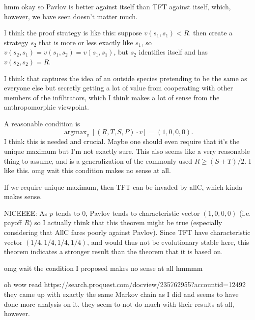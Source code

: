 \documentclass[11pt]{amsart}
\DeclareMathOperator*{\argmax}{argmax}
\theoremstyle{definition}
\theoremstyle{remark}
\begin{document}
hmm okay so Pavlov is better against itself than TFT against itself, which, however, we have seen doesn't matter much.


I think the proof strategy is like this: suppose $v(s_1,s_1) < R$. then create a strategy $s_2$ that is more or less exactly like $s_1$, so $v(s_2,s_1) = v(s_1,s_2) = v(s_1,s_1)$, but $s_2$ identifies itself and has $v(s_2,s_2) = R$.

I think that captures the idea of an outside species pretending to be the same as everyone else but secretly getting a lot of value from cooperating with other members of the infiltrators, which I think makes a lot of sense from the anthropomorphic viewpoint.

A reasonable condition is \begin{equation*}
  \argmax_v \left[ (R, T, S, P) \cdot v \right] = (1, 0, 0, 0).
\end{equation*}
I think this is needed and crucial. Maybe one should even require that it's the unique maximum but I'm not exactly sure. This also seems like a very reasonable thing to assume, and is a generalization of the commonly used $R \geq (S + T)/2$. I like this. omg wait this condition makes no sense at all.

If we require unique maximum, then TFT can be invaded by allC, which kinda makes sense.

NICEEEE: As $p$ tends to 0, Pavlov tends to characteristic vector $(1,0,0,0)$ (i.e. payoff $R$) so I actually think that this theorem might be true (especially considering that AllC fares poorly against Pavlov). Since TFT have characteristic vector $(1/4,1/4,1/4,1/4)$, and would thus not be evolutionary stable here, this theorem indicates a stronger result than the theorem that it is based on.

omg wait the condition I proposed makes no sense at all hmmmm

oh wow read https://search.proquest.com/docview/235762955?accountid=12492 they came up with exactly the same Markov chain as I did and seems to have done more analysis on it. they seem to not do much with their results at all, however.
\end{document}
